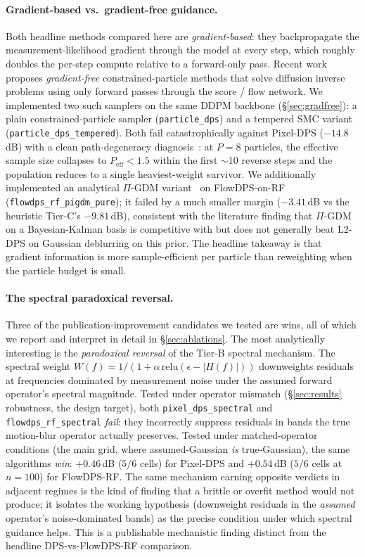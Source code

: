 \documentclass{article}
\begin{document}
\paragraph{Gradient-based vs.\ gradient-free guidance.}
Both headline methods compared here are \emph{gradient-based}: they
backpropagate the measurement-likelihood gradient through the model
at every step, which roughly doubles the per-step compute relative to
a forward-only pass. Recent work~\cite{dou2026particle} proposes
\emph{gradient-free} constrained-particle methods that solve diffusion
inverse problems using only forward passes through the score / flow
network. We implemented two such samplers on the same DDPM backbone
(\S\ref{sec:gradfree}): a plain constrained-particle sampler
(\texttt{particle\_dps}) and a tempered SMC variant
(\texttt{particle\_dps\_tempered}). Both fail catastrophically against
Pixel-DPS ($-14.8$\,dB) with a clean path-degeneracy
diagnosis~\cite{doucet2001smc}: at $P{=}8$ particles, the effective
sample size collapses to $P_\text{eff}{<}1.5$ within the first
$\sim$10 reverse steps and the population reduces to a single
heaviest-weight survivor. We additionally implemented an analytical
$\Pi$-GDM variant~\cite{song2023pigdm} on FlowDPS-on-RF
(\texttt{flowdps\_rf\_pigdm\_pure}); it failed by a much smaller
margin ($-3.41$\,dB vs the heuristic Tier-C's $-9.81$\,dB), consistent
with the literature finding that $\Pi$-GDM on a Bayesian-Kalman basis
is competitive with but does not generally beat L2-DPS on Gaussian
deblurring on this prior. The headline takeaway is that gradient
information is more sample-efficient per particle than reweighting
when the particle budget is small.

\paragraph{The spectral paradoxical reversal.}
Three of the publication-improvement candidates we tested are wins,
all of which we report and interpret in detail in
\S\ref{sec:ablations}. The most analytically interesting is the
\emph{paradoxical reversal} of the Tier-B spectral mechanism. The
spectral weight $W(f) = 1/(1 + \alpha\,\text{relu}(\epsilon - |H(f)|))$
downweights residuals at frequencies dominated by measurement noise
under the assumed forward operator's spectral magnitude. Tested
under operator mismatch (\S\ref{sec:results} robustness, the design
target), both \texttt{pixel\_dps\_spectral} and
\texttt{flowdps\_rf\_spectral} \emph{fail}: they incorrectly
suppress residuals in bands the true motion-blur operator actually
preserves. Tested under matched-operator conditions (the main grid,
where assumed-Gaussian \emph{is} true-Gaussian), the same algorithms
\emph{win}: $+0.46$\,dB ($5/6$ cells) for Pixel-DPS and $+0.54$\,dB
($5/6$ cells at $n{=}100$) for FlowDPS-RF. The same mechanism
earning opposite verdicts in adjacent regimes is the kind of finding
that a brittle or overfit method would not produce; it isolates the
working hypothesis (downweight residuals in the \emph{assumed}
operator's noise-dominated bands) as the precise condition under
which spectral guidance helps. This is a publishable mechanistic
finding distinct from the headline DPS-vs-FlowDPS-RF comparison.
\end{document}
